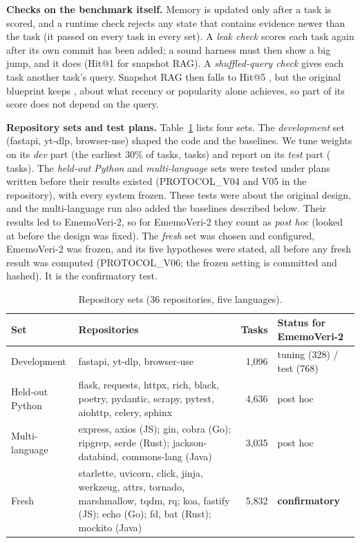 \documentclass[conference]{IEEEtran}
\newcommand{\sys}{EmemoVeri}
\begin{document}
\begin{table}[t]\centering\footnotesize\setlength{\tabcolsep}{3pt}
\resizebox{\columnwidth}{!}{}
\caption{Development repositories and task selection. Clock anomalies are commits whose recorded timestamp is earlier than the running clock.}
\label{tab:data}
\end{table}

\textbf{Checks on the benchmark itself.} Memory is updated only after a task is scored, and a runtime check rejects any state that contains evidence newer than the task (it passed on every task in every set). A \emph{leak check} scores each task again after its own commit has been added; a sound harness must then show a big jump, and it does (Hit@1 \leakSnapOne{} for snapshot RAG). A \emph{shuffled-query check} gives each task another task's query. Snapshot RAG then falls to Hit@5 \shufSnapFive{}, but the original blueprint keeps \shufEmvFive{}, about what recency or popularity alone achieves, so part of its score does not depend on the query.

\textbf{Repository sets and test plans.} Table~\ref{tab:sets} lists four sets. The \emph{development} set (fastapi, yt-dlp, browser-use) shaped the code and the baselines. We tune weights on its \emph{dev} part (the earliest 30\% of tasks, \nDev{} tasks) and report on its \emph{test} part (\nTest{} tasks). The \emph{held-out Python} and \emph{multi-language} sets were tested under plans written before their results existed (PROTOCOL\_V04 and V05 in the repository), with every system frozen. These tests were about the original design, and the multi-language run also added the baselines described below. Their results led to \sys{}-2, so for \sys{}-2 they count as \emph{post hoc} (looked at before the design was fixed). The \emph{fresh} set was chosen and configured, \sys{}-2 was frozen, and its five hypotheses were stated, all before any fresh result was computed (PROTOCOL\_V06; the frozen setting is committed and hashed). It is the confirmatory test.

\begin{table}[t]\centering\footnotesize\setlength{\tabcolsep}{3pt}
\begin{tabular}{@{}l p{} r p{}@{}}
\toprule
Set & Repositories & Tasks & Status for \sys{}-2 \\
\midrule
Development & fastapi, yt-dlp, browser-use & 1{,}096 & tuning (328) / test (768) \\
Held-out Python & flask, requests, httpx, rich, black, poetry, pydantic, scrapy, pytest, aiohttp, celery, sphinx & 4{,}636 & post hoc \\
Multi-language & express, axios (JS); gin, cobra (Go); ripgrep, serde (Rust); jackson-databind, commons-lang (Java) & 3{,}035 & post hoc \\
Fresh & starlette, uvicorn, click, jinja, werkzeug, attrs, tornado, marshmallow, tqdm, rq; koa, fastify (JS); echo (Go); fd, bat (Rust); mockito (Java) & 5{,}832 & \textbf{confirmatory} \\
\bottomrule
\end{tabular}
\caption{Repository sets (36 repositories, five languages).}
\label{tab:sets}
\end{table}
\end{document}
